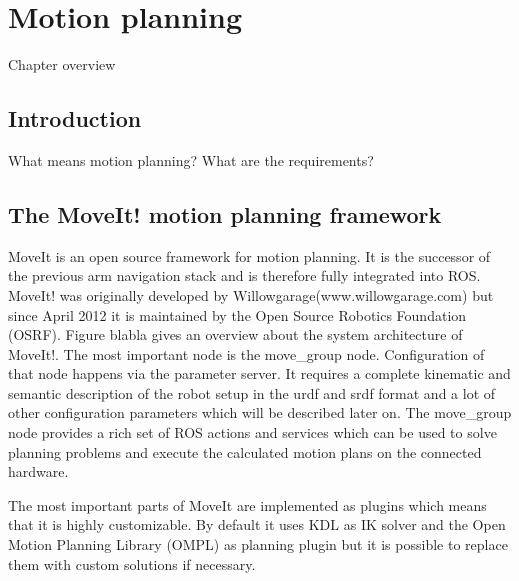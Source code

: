 
\chapter{Motion planning}
Chapter overview

\section{Introduction}
What means motion planning?
What are the requirements?



\section{The MoveIt! motion planning framework}

MoveIt is an open source framework for motion planning. It is the successor of the previous arm navigation stack and is therefore fully integrated into ROS. MoveIt! was originally developed by Willowgarage(www.willowgarage.com) but since April 2012 it is maintained by the Open Source Robotics Foundation (OSRF). Figure blabla gives an overview about the system architecture of MoveIt!. The most important node is the move\_group node. Configuration of that node happens via the parameter server. It requires a complete kinematic and semantic description of the robot setup in the urdf and srdf format and a lot of other configuration parameters which will be described later on. The move\_group node provides a rich set of ROS actions and services which can be used to solve planning problems and execute the calculated motion plans on the connected hardware.

The most important parts of MoveIt are implemented as plugins which means that it is highly customizable. By default it uses KDL as IK solver and the Open Motion Planning Library (OMPL) as planning plugin but it is possible to replace them with custom solutions if necessary.

